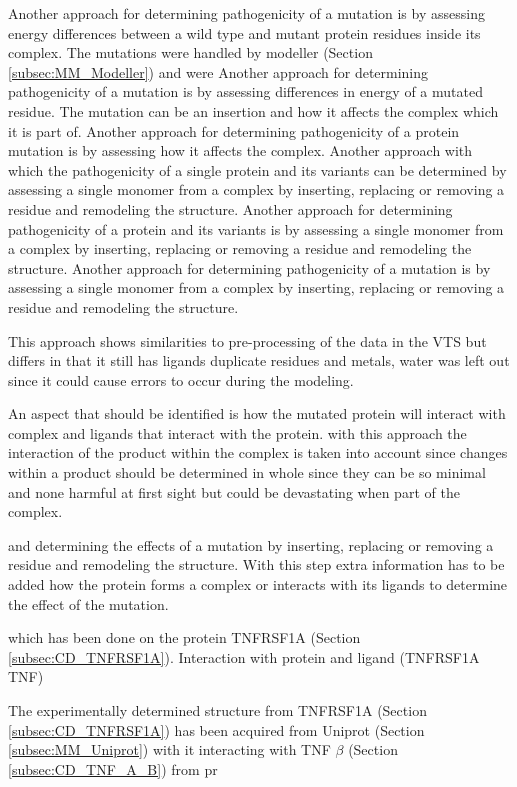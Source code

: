 Another approach for determining pathogenicity of a mutation is by assessing energy differences between a wild type and mutant protein residues inside its complex. The mutations were handled by modeller  (Section \ref{subsec:MM_Modeller}) and were 
Another approach for determining pathogenicity of a mutation is by assessing differences in energy of a mutated residue. The mutation can be an insertion  and how it affects the complex which it is part of.
Another approach for determining pathogenicity of a protein mutation is by assessing how it affects the complex. 
Another approach with which the pathogenicity of a single protein and its variants can be determined by assessing a single monomer 	from a complex by inserting, replacing or removing a residue and remodeling the structure. 
Another approach for determining pathogenicity of a protein and its variants is by assessing a single monomer 									 from a complex by inserting, replacing or removing a residue and remodeling the structure. 
Another approach for determining pathogenicity of a mutation is by assessing a single monomer 															from a complex by inserting, replacing or removing a residue and remodeling the structure. 

This approach shows similarities to pre-processing of the data in the VTS but differs in that it still has ligands duplicate residues and metals, water was left out since it could cause errors to occur during the modeling.




An aspect that should be identified is how the mutated protein will interact with complex and ligands that interact with the protein.  with this approach the interaction of the product within the complex is taken into account since changes within a product should be determined in whole since they can be so minimal and none harmful at first sight but could be devastating when part of the complex\cite{sorcecryXXXXXXXXXXXXXX}.

and determining the effects of a mutation by inserting, replacing or removing a residue and remodeling the structure. With this step extra information has to be added how the protein forms a complex or interacts with its ligands to determine the effect of the mutation.

 which has been done on the protein TNFRSF1A (Section \ref{subsec:CD_TNFRSF1A}). 
Interaction with protein and ligand (TNFRSF1A TNF)


The experimentally determined structure from TNFRSF1A (Section \ref{subsec:CD_TNFRSF1A}) has been acquired from Uniprot (Section \ref{subsec:MM_Uniprot}) with it interacting with TNF $\beta$ (Section \ref{subsec:CD_TNF_A_B}) from pr



